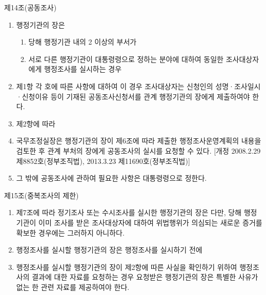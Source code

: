 제14조(공동조사)
\begin{enumerate}[①]\tightlist
\item 행정기관의 장은 
	\begin{enumerate}[1.]\tightlist
	\item 당해 행정기관 내의 2 이상의 부서가 
	\item 서로 다른 행정기관이 대통령령으로 정하는 분야에 대하여 동일한 조사대상자에게 행정조사를 실시하는 경우
	\end{enumerate}
\item 제1항 각 호에 따른 사항에 대하여  이 경우 조사대상자는 신청인의 성명·조사일시·신청이유 등이 기재된 공동조사신청서를 관계 행정기관의 장에게 제출하여야 한다.
\item 제2항에 따라 
\item 국무조정실장은 행정기관의 장이 제6조에 따라 제출한 행정조사운영계획의 내용을 검토한 후 관계 부처의 장에게 공동조사의 실시를 요청할 수 있다. [개정 2008.2.29 제8852호(정부조직법), 2013.3.23 제11690호(정부조직법)]
\item 그 밖에 공동조사에 관하여 필요한 사항은 대통령령으로 정한다.
\end{enumerate}

제15조(중복조사의 제한)
\begin{enumerate}[①]\tightlist
\item 제7조에 따라 정기조사 또는 수시조사를 실시한 행정기관의 장은  다만, 당해 행정기관이 이미 조사를 받은 조사대상자에 대하여 위법행위가 의심되는 새로운 증거를 확보한 경우에는 그러하지 아니하다.
\item 행정조사를 실시할 행정기관의 장은 행정조사를 실시하기 전에 
\item 행정조사를 실시할 행정기관의 장이 제2항에 따른 사실을 확인하기 위하여 행정조사의 결과에 대한 자료를 요청하는 경우 요청받은 행정기관의 장은 특별한 사유가 없는 한 관련 자료를 제공하여야 한다.
\end{enumerate}

